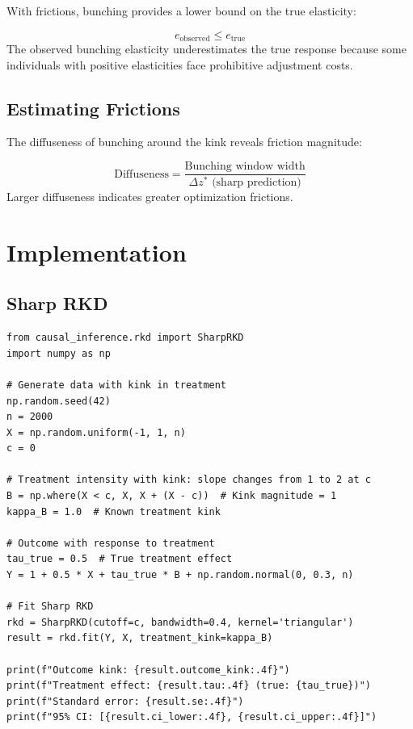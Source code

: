 With frictions, bunching provides a lower bound on the true elasticity:

\begin{proposition}
\label{prop:elasticity_bounds}
\begin{equation}
    e_{\text{observed}} \leq e_{\text{true}}
\end{equation}
The observed bunching elasticity underestimates the true response because some individuals with positive elasticities face prohibitive adjustment costs.
\end{proposition}

\subsection{Estimating Frictions}

The diffuseness of bunching around the kink reveals friction magnitude:

\begin{definition}
\begin{equation}
    \text{Diffuseness} = \frac{\text{Bunching window width}}{\Delta z^* \text{ (sharp prediction)}}
\end{equation}
Larger diffuseness indicates greater optimization frictions.
\end{definition}

\section{Implementation}
\label{sec:kink_implementation}

\subsection{Sharp RKD}

\begin{verbatim}
from causal_inference.rkd import SharpRKD
import numpy as np

# Generate data with kink in treatment
np.random.seed(42)
n = 2000
X = np.random.uniform(-1, 1, n)
c = 0

# Treatment intensity with kink: slope changes from 1 to 2 at c
B = np.where(X < c, X, X + (X - c))  # Kink magnitude = 1
kappa_B = 1.0  # Known treatment kink

# Outcome with response to treatment
tau_true = 0.5  # True treatment effect
Y = 1 + 0.5 * X + tau_true * B + np.random.normal(0, 0.3, n)

# Fit Sharp RKD
rkd = SharpRKD(cutoff=c, bandwidth=0.4, kernel='triangular')
result = rkd.fit(Y, X, treatment_kink=kappa_B)

print(f"Outcome kink: {result.outcome_kink:.4f}")
print(f"Treatment effect: {result.tau:.4f} (true: {tau_true})")
print(f"Standard error: {result.se:.4f}")
print(f"95% CI: [{result.ci_lower:.4f}, {result.ci_upper:.4f}]")
\end{verbatim}

